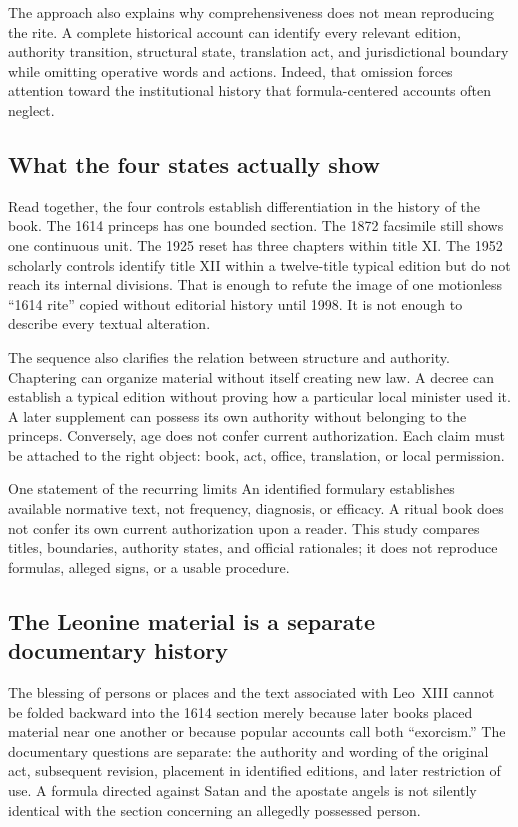 The approach also explains why comprehensiveness does not mean reproducing the
rite. A complete historical account can identify every relevant edition,
authority transition, structural state, translation act, and jurisdictional
boundary while omitting operative words and actions. Indeed, that omission
forces attention toward the institutional history that formula-centered
accounts often neglect.

\subsection{What the four states actually show}

Read together, the four controls establish differentiation in the history of
the book. The 1614 princeps has one bounded section. The 1872 facsimile still
shows one continuous unit. The 1925 reset has three chapters within title XI.
The 1952 scholarly controls identify title XII within a twelve-title typical
edition but do not reach its internal divisions. That is enough to refute the
image of one motionless ``1614 rite'' copied without editorial history until
1998. It is not enough to describe every textual alteration.

The sequence also clarifies the relation between structure and authority.
Chaptering can organize material without itself creating new law. A decree can
establish a typical edition without proving how a particular local minister
used it. A later supplement can possess its own authority without belonging
to the princeps. Conversely, age does not confer current authorization. Each
claim must be attached to the right object: book, act, office, translation,
or local permission.

\begin{studybox}{One statement of the recurring limits}
An identified formulary establishes available normative text, not frequency,
diagnosis, or efficacy. A ritual book does not confer its own current
authorization upon a reader. This study compares titles, boundaries,
authority states, and official rationales; it does not reproduce formulas,
alleged signs, or a usable procedure.
\end{studybox}

\subsection{The Leonine material is a separate documentary history}

The blessing of persons or places and the text associated with Leo~XIII
cannot be folded backward into the 1614 section merely because later books
placed material near one another or because popular accounts call both
``exorcism.'' The documentary questions are separate: the authority and
wording of the original act, subsequent revision, placement in identified
editions, and later restriction of use. A formula directed against Satan and
the apostate angels is not silently identical with the section concerning an
allegedly possessed person.


